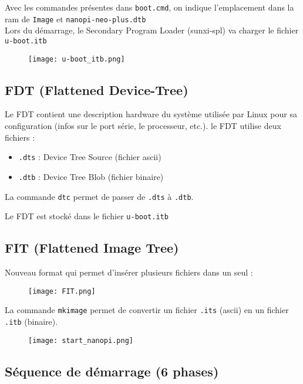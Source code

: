 Avec les commandes présentes dans \verb!boot.cmd!, on indique l'emplacement dans la ram de \verb!Image! et \verb!nanopi-neo-plus.dtb!\\
Lors du démarrage, le Secondary Program Loader (sunxi-spl) va charger le fichier \verb!u-boot.itb!
\begin{figure}[H]
    \centering
    \texttt{[image: u-boot\_itb.png]}
\end{figure}
\subsection{FDT (Flattened Device-Tree)}
Le FDT contient une description hardware du système utilisée par Linux pour sa configuration (infos sur le port série, le processeur, etc.). le FDT utilise deux fichiers :
\begin{itemize}
\item \verb!.dts! : Device Tree Source (fichier ascii)
\item \verb!.dtb! : Device Tree Blob (fichier binaire)
\end{itemize}
La commande \verb!dtc! permet de passer de \verb!.dts! à \verb!.dtb!.

Le FDT est stocké dans le fichier \verb!u-boot.itb!
\subsection{FIT (Flattened Image Tree)}
Nouveau format qui permet d'insérer plusieurs fichiers dans un seul :
\begin{figure}[H]
    \centering
    \texttt{[image: FIT.png]}
\end{figure}
La commande \verb!mkimage! permet de convertir un fichier \verb!.its! (ascii) en un fichier \verb!.itb! (binaire).

\begin{figure}[H]
    \centering
    \texttt{[image: start\_nanopi.png]}
\end{figure}

\subsection{Séquence de démarrage (6 phases)}

